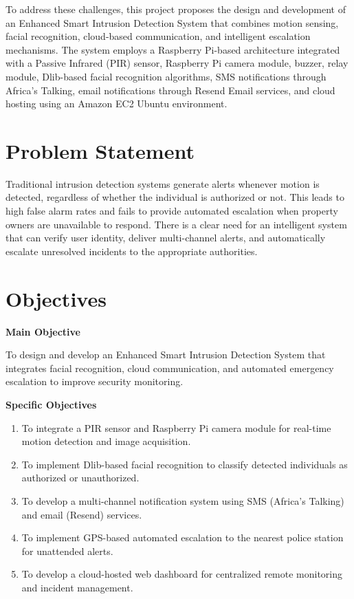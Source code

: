 \documentclass[12pt,a4paper,oneside]{report}
\begin{document}
To address these challenges, this project proposes the design and development of an Enhanced Smart Intrusion Detection System that combines motion sensing, facial recognition, cloud-based communication, and intelligent escalation mechanisms. The system employs a Raspberry Pi-based architecture integrated with a Passive Infrared (PIR) sensor, Raspberry Pi camera module, buzzer, relay module, Dlib-based facial recognition algorithms, SMS notifications through Africa's Talking, email notifications through Resend Email services, and cloud hosting using an Amazon EC2 Ubuntu environment.

\section{Problem Statement}

Traditional intrusion detection systems generate alerts whenever motion is detected, regardless of whether the individual is authorized or not. This leads to high false alarm rates and fails to provide automated escalation when property owners are unavailable to respond. There is a clear need for an intelligent system that can verify user identity, deliver multi-channel alerts, and automatically escalate unresolved incidents to the appropriate authorities.

\section{Objectives}

\textbf{Main Objective}

To design and develop an Enhanced Smart Intrusion Detection System that integrates facial recognition, cloud communication, and automated emergency escalation to improve security monitoring.

\textbf{Specific Objectives}

\begin{enumerate}
  \item To integrate a PIR sensor and Raspberry Pi camera module for real-time motion detection and image acquisition.
  \item To implement Dlib-based facial recognition to classify detected individuals as authorized or unauthorized.
  \item To develop a multi-channel notification system using SMS (Africa's Talking) and email (Resend) services.
  \item To implement GPS-based automated escalation to the nearest police station for unattended alerts.
  \item To develop a cloud-hosted web dashboard for centralized remote monitoring and incident management.
\end{enumerate}
\end{document}
